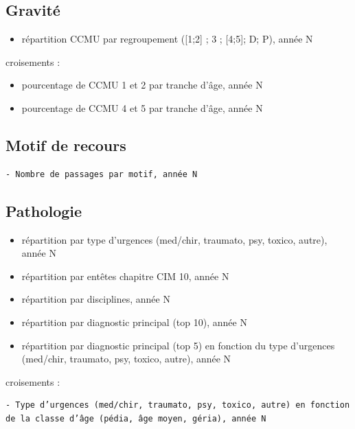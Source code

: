 \documentclass[]{article}
\begin{document}
\subsection{Gravité}\label{gravite}

\begin{itemize}
\itemsep1pt\parskip0pt
\item
  répartition CCMU par regroupement ({[}1;2{]} ; 3 ; {[}4;5{]}; D; P),
  année N
\end{itemize}

croisements :

\begin{itemize}
\itemsep1pt\parskip0pt
\item
  pourcentage de CCMU 1 et 2 par tranche d'âge, année N
\item
  pourcentage de CCMU 4 et 5 par tranche d'âge, année N
\end{itemize}

\subsection{Motif de recours}\label{motif-de-recours}

\begin{verbatim}
- Nombre de passages par motif, année N 
\end{verbatim}

\subsection{Pathologie}\label{pathologie}

\begin{itemize}
\itemsep1pt\parskip0pt
\item
  répartition par type d'urgences (med/chir, traumato, psy, toxico,
  autre), année N
\item
  répartition par entêtes chapitre CIM 10, année N
\item
  répartition par disciplines, année N
\item
  répartition par diagnostic principal (top 10), année N
\item
  répartition par diagnostic principal (top 5) en fonction du type
  d'urgences (med/chir, traumato, psy, toxico, autre), année N
\end{itemize}

croisements :

\begin{verbatim}
- Type d’urgences (med/chir, traumato, psy, toxico, autre) en fonction de la classe d’âge (pédia, âge moyen, géria), année N
\end{verbatim}
\end{document}

